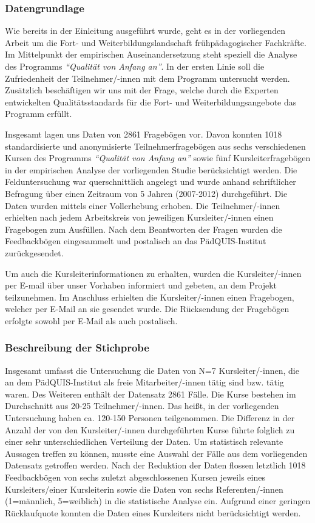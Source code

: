 \documentclass[12pt,a4paper]{article}
\begin{document}
\subsubsection{Datengrundlage}

Wie bereits in der Einleitung ausgeführt wurde, geht es in der vorliegenden Arbeit um die Fort- und Weiterbildungslandschaft frühpädagogischer Fachkräfte. Im Mittelpunkt der empirischen Auseinandersetzung steht spe\-zi\-ell die Analyse des Programms \textit{"`Qualität von Anfang an"'}. In der ersten Linie soll die Zufriedenheit der Teilnehmer/-innen mit dem Programm untersucht werden. Zusätzlich beschäftigen wir uns mit der Frage, welche durch die Experten entwickelten Qualitätsstandards für die Fort- und Weiterbildungsangebote das Programm erfüllt. 

Insgesamt lagen uns Daten von 2861 Fragebögen vor. Davon konnten 1018 standardisierte und anonymisierte Teilnehmerfragebögen aus sechs verschiedenen Kursen des Programms \textit{"`Qualität von Anfang an"'} sowie fünf Kursleiterfragebögen in der empirischen Analyse der vorliegenden Studie berücksichtigt werden. Die Felduntersuchung war querschnittlich angelegt und wurde anhand schriftlicher Befragung über einen Zeitraum von 5 Jahren (2007-2012) durchgeführt. Die Daten wurden mittels einer Vollerhebung erhoben. Die Teilnehmer/-innen erhielten nach jedem Arbeitskreis von jeweiligen Kursleiter/-innen einen Fragebogen zum Ausfüllen. Nach dem Beantworten der Fragen wurden die Feedbackbögen eingesammelt und postalisch an das PädQUIS-Institut zurückgesendet. 

Um  auch die Kursleiterinformationen zu erhalten, wurden die Kursleiter/-innen per E-mail über unser Vorhaben informiert und gebeten, an dem Projekt teilzunehmen. Im Anschluss erhielten die Kursleiter/-innen einen Fragebogen, welcher per E-Mail an sie gesendet wurde. Die Rücksendung der Fragebögen erfolgte sowohl per E-Mail als auch postalisch.

\subsubsection{Beschreibung der Stichprobe}

Insgesamt umfasst die Untersuchung die Daten von N=7 Kursleiter/-innen, die an dem PädQUIS-Institut als freie Mitarbeiter/-innen tätig sind bzw. tätig waren. Des Weiteren enthält der Datensatz 2861 Fälle. Die Kurse bestehen im Durchschnitt aus 20-25 Teilnehmer/-innen. Das heißt, in der vorliegenden Untersuchung haben ca. 120-150 Personen teilgenommen. Die Differenz in der Anzahl der von den Kursleiter/-innen durchgeführten Kurse führte folglich zu einer sehr unterschiedlichen Verteilung der Daten. Um statistisch relevante Aussagen treffen zu können, musste eine Auswahl der Fälle aus dem vorliegenden Datensatz getroffen werden. Nach der Reduktion der Daten flossen letztlich 1018 Feedbackbögen von sechs zuletzt abgeschlossenen Kursen jeweils eines Kursleiters/einer Kursleiterin sowie die Daten von sechs Referenten/-innen (1=männlich, 5=weiblich) in die statistische Analyse ein. Aufgrund einer geringen Rücklaufquote konnten die Daten eines Kursleiters nicht berücksichtigt werden. 
\end{document}
